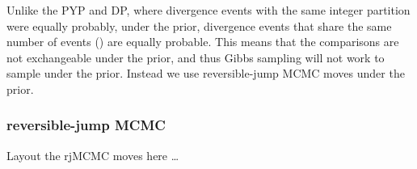 Unlike the PYP and DP, where divergence events with the same
integer partition were equally probably, under the
\wunif prior, divergence events that share the same number of events (\nevents) are
equally probable.
This means that the comparisons are not exchangeable under the \wunif prior,
and thus Gibbs sampling will not work to sample \etimesets under the \wunif
prior.
Instead we use reversible-jump MCMC moves under the \wunif prior.

\subsubsection{reversible-jump MCMC}
Layout the rjMCMC moves here \ldots

